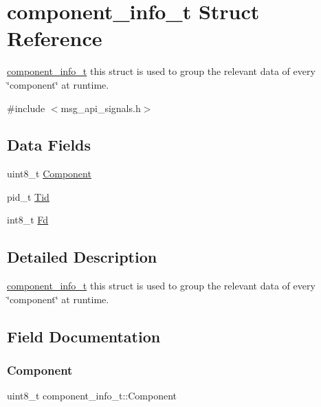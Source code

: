 \hypertarget{structcomponent__info__t}{}\section{component\+\_\+info\+\_\+t Struct Reference}
\label{structcomponent__info__t}


\mbox{\hyperlink{structcomponent__info__t}{component\+\_\+info\+\_\+t}} this struct is used to group the relevant data of every \char`\"{}component\char`\"{} at runtime.  




{\ttfamily \#include $<$msg\+\_\+api\+\_\+signals.\+h$>$}

\subsection*{Data Fields}
\begin{DoxyCompactItemize}
\item 
uint8\+\_\+t \mbox{\hyperlink{structcomponent__info__t_a1c9e41fb6f753bbf0fe114a84d214b74}{Component}}
\item 
pid\+\_\+t \mbox{\hyperlink{structcomponent__info__t_a1d476cfc985de67209644f02cbfc97fa}{Tid}}
\item 
int8\+\_\+t \mbox{\hyperlink{structcomponent__info__t_a45e7ac1a6e936b8abf385a704d136351}{Fd}}
\end{DoxyCompactItemize}


\subsection{Detailed Description}
\mbox{\hyperlink{structcomponent__info__t}{component\+\_\+info\+\_\+t}} this struct is used to group the relevant data of every \char`\"{}component\char`\"{} at runtime. 

\subsection{Field Documentation}
\mbox{\label{structcomponent__info__t_a1c9e41fb6f753bbf0fe114a84d214b74}} 
\subsubsection{\texorpdfstring{Component}{Component}}
{\footnotesize\ttfamily uint8\+\_\+t component\+\_\+info\+\_\+t\+::\+Component}

